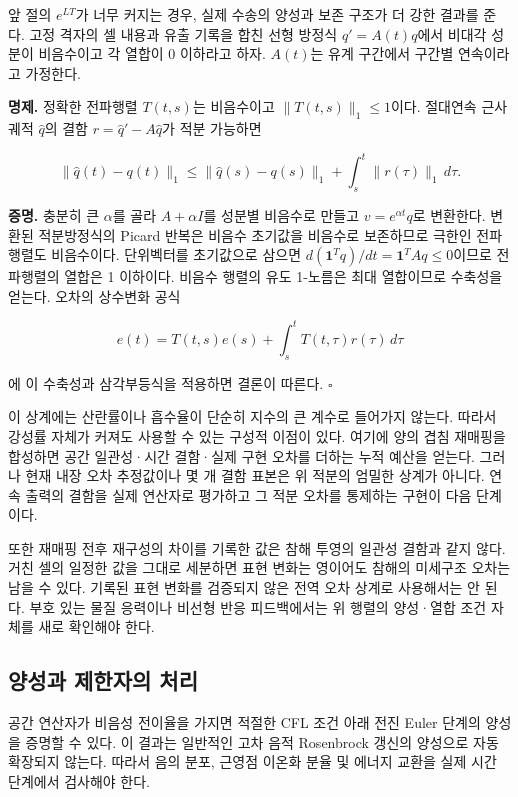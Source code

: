 \documentclass[
  10pt,
  a4paper,
]{article}
\begin{document}
앞 절의 \(e^{LT}\)가 너무 커지는 경우, 실제 수송의 양성과 보존 구조가 더
강한 결과를 준다. 고정 격자의 셀 내용과 유출 기록을 합친 선형 방정식
\(q'=A(t)q\)에서 비대각 성분이 비음수이고 각 열합이 0 이하라고 하자.
\(A(t)\)는 유계 구간에서 구간별 연속이라고 가정한다.

\textbf{명제.} 정확한 전파행렬 \(T(t,s)\)는 비음수이고
\(\|T(t,s)\|_1\le1\)이다. 절대연속 근사 궤적 \(\widehat q\)의 결함
\(r=\widehat q'-A\widehat q\)가 적분 가능하면

\[
\|\widehat q(t)-q(t)\|_1
\le\|\widehat q(s)-q(s)\|_1+\int_s^t\|r(\tau)\|_1\,d\tau.
\]

\textbf{증명.} 충분히 큰 \(\alpha\)를 골라 \(A+\alpha I\)를 성분별
비음수로 만들고 \(v=e^{\alpha t}q\)로 변환한다. 변환된 적분방정식의
Picard 반복은 비음수 초기값을 비음수로 보존하므로 극한인 전파행렬도
비음수이다. 단위벡터를 초기값으로 삼으면
\(d(\mathbf1^Tq)/dt=\mathbf1^TAq\le0\)이므로 전파행렬의 열합은 1
이하이다. 비음수 행렬의 유도 1-노름은 최대 열합이므로 수축성을 얻는다.
오차의 상수변화 공식

\[
e(t)=T(t,s)e(s)+\int_s^tT(t,\tau)r(\tau)\,d\tau
\]

에 이 수축성과 삼각부등식을 적용하면 결론이 따른다. \(\square\)

이 상계에는 산란률이나 흡수율이 단순히 지수의 큰 계수로 들어가지 않는다.
따라서 강성률 자체가 커져도 사용할 수 있는 구성적 이점이 있다. 여기에
양의 겹침 재매핑을 합성하면 공간 일관성·시간 결함·실제 구현 오차를
더하는 누적 예산을 얻는다. 그러나 현재 내장 오차 추정값이나 몇 개 결함
표본은 위 적분의 엄밀한 상계가 아니다. 연속 출력의 결함을 실제 연산자로
평가하고 그 적분 오차를 통제하는 구현이 다음 단계이다.

또한 재매핑 전후 재구성의 차이를 기록한 값은 참해 투영의 일관성 결함과
같지 않다. 거친 셀의 일정한 값을 그대로 세분하면 표현 변화는 영이어도
참해의 미세구조 오차는 남을 수 있다. 기록된 표현 변화를 검증되지 않은
전역 오차 상계로 사용해서는 안 된다. 부호 있는 물질 응력이나 비선형 반응
피드백에서는 위 행렬의 양성·열합 조건 자체를 새로 확인해야 한다.

\hypertarget{uxc591uxc131uxacfc-uxc81cuxd55cuxc790uxc758-uxcc98uxb9ac}{%
\subsection{양성과 제한자의
처리}\label{uxc591uxc131uxacfc-uxc81cuxd55cuxc790uxc758-uxcc98uxb9ac}}

공간 연산자가 비음성 전이율을 가지면 적절한 CFL 조건 아래 전진 Euler
단계의 양성을 증명할 수 있다. 이 결과는 일반적인 고차 음적 Rosenbrock
갱신의 양성으로 자동 확장되지 않는다. 따라서 음의 분포, 근영점 이온화
분율 및 에너지 교환을 실제 시간 단계에서 검사해야 한다.
\end{document}
